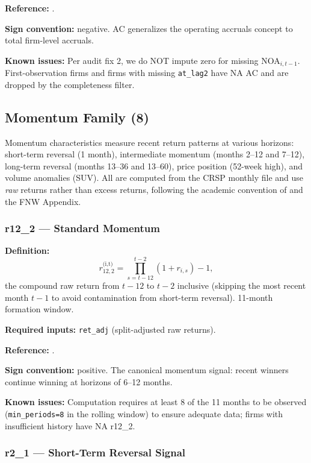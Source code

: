 \textbf{Reference:} \cite{RichardsonSloanSoliman2005}.

\textbf{Sign convention:} negative. AC generalizes the operating
accruals concept to total firm-level accruals.

\textbf{Known issues:} Per audit fix 2, we do NOT impute zero for
missing NOA${}_{i,t-1}$. First-observation firms and firms with missing
\texttt{at\_lag2} have NA AC and are dropped by the completeness filter.

\subsection{Momentum Family (8)}
\label{subsec:stage0-momentum}

Momentum characteristics measure recent return patterns at various
horizons: short-term reversal (1 month), intermediate momentum (months
2--12 and 7--12), long-term reversal (months 13--36 and 13--60), price
position (52-week high), and volume anomalies (SUV). All are computed
from the CRSP monthly file and use \emph{raw} returns rather than
excess returns, following the academic convention of
\cite{JegadeeshTitman1993} and the FNW Appendix.

\subsubsection{r12\_2 --- Standard Momentum}

\textbf{Definition:}
\begin{equation}
r_{12,2}^{\text{(i,t)}} = \prod_{s=t-12}^{t-2} (1 + r_{i,s}) - 1,
\label{eq:r12-2}
\end{equation}
the compound raw return from $t-12$ to $t-2$ inclusive (skipping the
most recent month $t-1$ to avoid contamination from short-term
reversal). 11-month formation window.

\textbf{Required inputs:} \texttt{ret\_adj} (split-adjusted raw returns).

\textbf{Reference:} \cite{JegadeeshTitman1993,FamaFrench1996}.

\textbf{Sign convention:} positive. The canonical momentum signal:
recent winners continue winning at horizons of 6--12 months.

\textbf{Known issues:} Computation requires at least 8 of the 11 months
to be observed (\texttt{min\_periods=8} in the rolling window) to
ensure adequate data; firms with insufficient history have NA r12\_2.

\subsubsection{r2\_1 --- Short-Term Reversal Signal}

